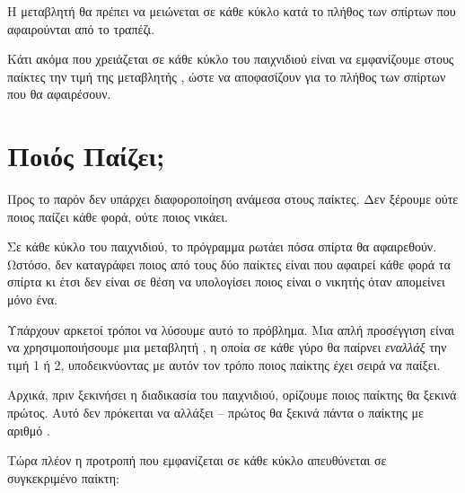 \documentclass[a4paper,11pt,oneside]{book}
\begin{document}

Η μεταβλητή  θα πρέπει να μειώνεται σε κάθε κύκλο κατά το πλήθος των σπίρτων που αφαιρούνται από το τραπέζι.


Κάτι ακόμα που χρειάζεται σε κάθε κύκλο του παιχνιδιού είναι να εμφανίζουμε στους παίκτες την τιμή της μεταβλητής , ώστε να αποφασίζουν για το πλήθος των σπίρτων που θα αφαιρέσουν.



\section{Ποιός Παίζει;}

\begin{question}
Προς το παρόν δεν υπάρχει διαφοροποίηση ανάμεσα στους παίκτες. Δεν ξέρουμε ούτε ποιος παίζει κάθε φορά, ούτε ποιος νικάει.
\end{question}

Σε κάθε κύκλο του παιχνιδιού, το πρόγραμμα ρωτάει πόσα σπίρτα θα αφαιρεθούν. Ωστόσο, δεν καταγράφει ποιος από τους δύο παίκτες είναι που αφαιρεί κάθε φορά τα σπίρτα κι έτσι δεν είναι σε θέση να υπολογίσει ποιος είναι ο νικητής όταν απομείνει μόνο ένα. 

Υπάρχουν αρκετοί τρόποι να λύσουμε αυτό το πρόβλημα. Μια απλή προσέγγιση είναι να χρησιμοποιήσουμε μια μεταβλητή , η οποία σε κάθε γύρο θα παίρνει \emph{εναλλάξ} την τιμή 1 ή 2, υποδεικνύοντας με αυτόν τον τρόπο ποιος παίκτης έχει σειρά να παίξει.

Αρχικά, πριν ξεκινήσει η διαδικασία του παιχνιδιού, ορίζουμε ποιος παίκτης θα ξεκινά πρώτος. Αυτό δεν πρόκειται να αλλάξει -- πρώτος θα ξεκινά πάντα ο παίκτης με αριθμό .


Τώρα πλέον η προτροπή που εμφανίζεται σε κάθε κύκλο απευθύνεται σε συγκεκριμένο παίκτη:

\end{document}
